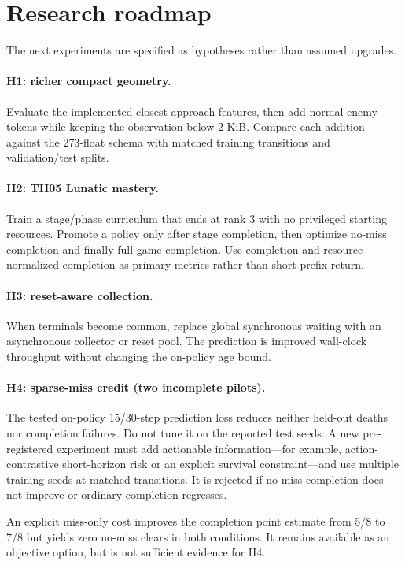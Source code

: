 \documentclass[10pt]{article}
\begin{document}
\section{Research roadmap}

The next experiments are specified as hypotheses rather than assumed upgrades.

\paragraph{H1: richer compact geometry.}
Evaluate the implemented closest-approach features, then add normal-enemy
tokens while keeping the observation below 2 KiB.  Compare each addition
against the 273-float schema with matched training transitions and
validation/test splits.

\paragraph{H2: TH05 Lunatic mastery.}
Train a stage/phase curriculum that ends at rank 3 with no privileged starting
resources.  Promote a policy only after stage completion, then optimize no-miss
completion and finally full-game completion.  Use completion and
resource-normalized completion as primary metrics rather than short-prefix
return.

\paragraph{H3: reset-aware collection.}
When terminals become common, replace global synchronous waiting with an
asynchronous collector or reset pool.  The prediction is improved wall-clock
throughput without changing the on-policy age bound.

\paragraph{H4: sparse-miss credit (two incomplete pilots).}
The tested on-policy 15/30-step prediction loss reduces neither held-out deaths
nor completion failures.  Do not tune it on the reported test seeds.  A new
pre-registered experiment must add actionable information---for example,
action-contrastive short-horizon risk or an explicit survival constraint---and
use multiple training seeds at matched transitions.  It is rejected if no-miss
completion does not improve or ordinary completion regresses.

An explicit miss-only cost improves the completion point estimate from 5/8 to
7/8 but yields zero no-miss clears in both conditions.  It remains available as
an objective option, but is not sufficient evidence for H4.
\end{document}
